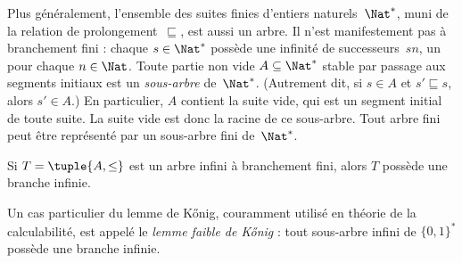 \documentclass[../../../include/open-logic-section]{subfiles}
\begin{document}
\begin{ex}
Plus généralement, l’ensemble des suites finies d’entiers naturels~$\Nat^*$,
muni de la relation de prolongement~$\sqsubseteq$, est aussi un arbre.
Il n’est manifestement pas à branchement fini : chaque $s \in \Nat^*$
possède une infinité de successeurs~$sn$, un pour chaque $n \in \Nat$.
Toute partie non vide $A \subseteq \Nat^*$ stable par passage aux
segments initiaux est un \emph{sous-arbre} de~$\Nat^*$.
(Autrement dit, si $s \in A$ et $s' \sqsubseteq s$, alors $s' \in A$.)
En particulier, $A$ contient la suite vide, qui est un segment initial
de toute suite. La suite vide est donc la racine de ce sous-arbre.
%
Tout arbre fini peut être représenté par un sous-arbre fini de~$\Nat^*$.
\end{ex}

\begin{prop}
Si $T = \tuple{A,\le}$ est un arbre infini à branchement fini,
alors $T$ possède une branche infinie.
\end{prop}

Un cas particulier du lemme de K\H{o}nig, couramment utilisé en théorie
de la calculabilité, est appelé le \emph{lemme faible de K\H{o}nig} :
tout sous-arbre infini de $\{0,1\}^*$ possède une branche infinie.
\end{document}
